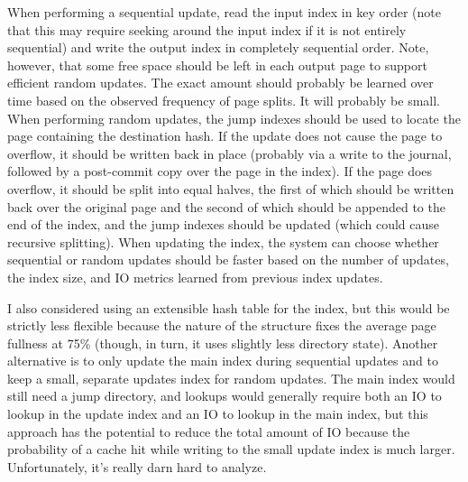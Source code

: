 {\begin{itemize}
  When performing a sequential update, read the input index in key
  order (note that this may require seeking around the input index
  if it is not entirely sequential) and write the output index in
  completely sequential order.  Note, however, that some free space
  should be left in each output page to support efficient random
  updates.  The exact amount should probably be learned over time
  based on the observed frequency of page splits.  It will probably
  be small.  When performing random updates, the jump indexes should
  be used to locate the page containing the destination hash.  If
  the update does not cause the page to overflow, it should be
  written back in place (probably via a write to the journal,
  followed by a post-commit copy over the page in the index).  If
  the page does overflow, it should be split into equal halves, the
  first of which should be written back over the original page and
  the second of which should be appended to the end of the index,
  and the jump indexes should be updated (which could cause
  recursive splitting).  When updating the index, the system can
  choose whether sequential or random updates should be faster based
  on the number of updates, the index size, and IO metrics learned
  from previous index updates.

  I also considered using an extensible hash table for the index,
  but this would be strictly less flexible because the nature of the
  structure fixes the average page fullness at 75\% (though, in
  turn, it uses slightly less directory state).  Another alternative
  is to only update the main index during sequential updates and to
  keep a small, separate updates index for random updates.  The main
  index would still need a jump directory, and lookups would
  generally require both an IO to lookup in the update index and an
  IO to lookup in the main index, but this approach has the
  potential to reduce the total amount of IO because the
  probability of a cache hit while writing to the small update index
  is much larger.  Unfortunately, it's really darn hard to analyze.
\end{itemize}
}

